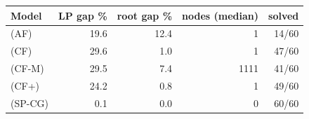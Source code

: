 \begin{tabular}{lrrrr}
\toprule
Model & LP gap \% & root gap \% & nodes (median) & solved \\
\midrule
(AF) & 19.6 & 12.4 & 1 & 14/60 \\
(CF) & 29.6 & 1.0 & 1 & 47/60 \\
(CF-M) & 29.5 & 7.4 & 1111 & 41/60 \\
(CF+) & 24.2 & 0.8 & 1 & 49/60 \\
(SP-CG) & 0.1 & 0.0 & 0 & 60/60 \\
\bottomrule
\end{tabular}
